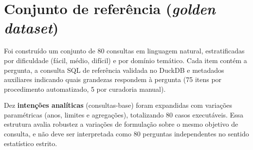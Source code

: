 \section{Conjunto de referência (\textit{golden dataset})}

Foi construído um conjunto de 80 consultas em linguagem natural, estratificadas por dificuldade (fácil, médio, difícil) e por domínio temático. Cada item contém a pergunta, a consulta SQL de referência validada no DuckDB e metadados auxiliares indicando quais grandezas respondem à pergunta (75 itens por procedimento automatizado, 5 por curadoria manual).

Dez \textbf{intenções analíticas} (consultas-base) foram expandidas com variações paramétricas (anos, limites e agregações), totalizando 80 casos executáveis. Essa estrutura avalia robustez a variações de formulação sobre o mesmo objetivo de consulta, e não deve ser interpretada como 80 perguntas independentes no sentido estatístico estrito.


